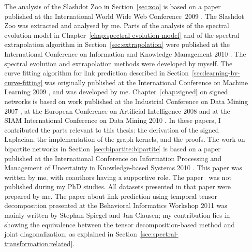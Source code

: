\documentclass[11pt,a4paper]{book}
\begin{document}
The analysis of the
Slashdot Zoo in Section~\ref{sec:zoo} is based on a paper published at
the International World Wide Web Conference~2009 \cite{kunegis:slashdot-zoo}. 
The Slashdot Zoo was extracted and analysed by me. 
Parts of the analysis of the spectral evolution model in
Chapter~\ref{chap:spectral-evolution-model} 
and of the spectral extrapolation algorithm in
Section~\ref{sec:extrapolation} were 
published at the International Conference on Information and Knowledge
Management 2010 \cite{kunegis:spectral-network-evolution}.    
The spectral evolution and extrapolation methods were developed by
myself. 
The curve fitting algorithm for link prediction described in
Section~\ref{sec:learning-by-curve-fitting} was originally published at 
the International Conference on Machine Learning 2009
\cite{kunegis:spectral-transformation}, and was developed by 
me.  
Chapter~\ref{chap:signed} on signed networks is based on work published at
the Industrial Conference on Data Mining
2007 \cite{kunegis:negative-resistance},
at the European Conference on Artificial Intelligence 2008
\cite{kunegis:netflix-srd} and at the SIAM International Conference on
Data Mining 2010 \cite{kunegis:signed-kernels}.
In these papers, I contributed the parts relevant to this thesis:  the
derivation of the signed Laplacian, the implementation of the
graph kernels, and the proofs.
The work on bipartite networks in Section~\ref{sec:bipartite:bipartite}
is based on a paper 
published at the International Conference on Information
Processing and Management of Uncertainty in Knowledge-based Systems 2010
\cite{kunegis:hyperbolic-sine}. 
This paper was written by me, with coauthors having a supportive
role. 
The paper~\cite{kunegis:network-survey} was not published
during my PhD studies.  All datasets presented in that paper were
prepared by me.
The paper about link prediction using temporal tensor
decomposition presented at the Behavioral Informatics Workshop 2011
\cite{spiegel:time-tensor} was mainly 
written by Stephan 
Spiegel and Jan Clausen; my contribution lies in showing the equivalence
between the tensor decomposition-based method and joint
diagonalization, as explained in
Section~\ref{sec:spectral-transformation:related}.  
\end{document}
